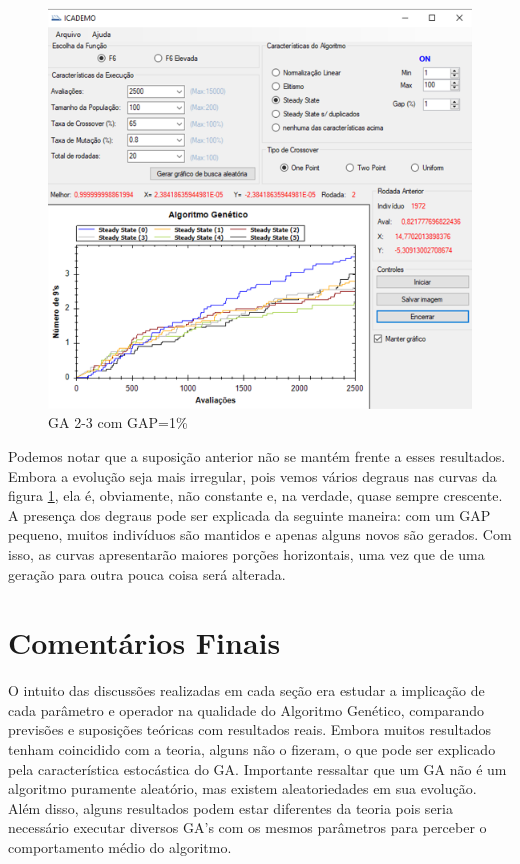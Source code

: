 \documentclass[12pt]{article}
\begin{document}
\begin{figure}[H]
	\centering
	\includegraphics[width=0.7\linewidth]{Imagens/questao8_GAPpequeno}
	\caption{GA 2-3 com GAP=1\%}
	\label{fig:questao8GAPpequeno}
\end{figure}

Podemos notar que a suposição anterior não se mantém frente a esses resultados. Embora a evolução seja mais irregular, pois vemos vários degraus nas curvas da figura \ref{fig:questao8GAPpequeno}, ela é, obviamente, não constante e, na verdade, quase sempre crescente. A presença dos degraus pode ser explicada da seguinte maneira: com um GAP pequeno, muitos indivíduos são mantidos e apenas alguns novos são gerados. Com isso, as curvas apresentarão maiores porções horizontais, uma vez que de uma geração para outra pouca coisa será alterada.

\section{Comentários Finais}

O intuito das discussões realizadas em cada seção era estudar a implicação de cada parâmetro e operador na qualidade do Algoritmo Genético, comparando previsões e suposições teóricas com resultados reais. Embora muitos resultados tenham coincidido com a teoria, alguns não o fizeram, o que pode ser explicado pela característica estocástica do GA. Importante ressaltar que um GA não é um algoritmo puramente aleatório, mas existem aleatoriedades em sua evolução. Além disso, alguns resultados podem estar diferentes da teoria pois seria necessário executar diversos GA's com os mesmos parâmetros para perceber o comportamento médio do algoritmo. 

	 
	
\end{document}
